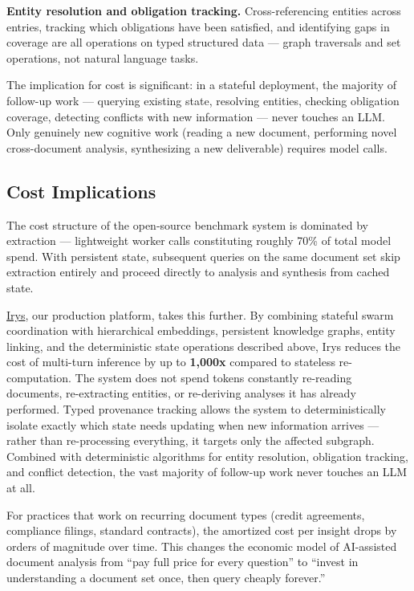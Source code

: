 \documentclass[11pt,a4paper]{article}
\begin{document}
\textbf{Entity resolution and obligation tracking.} Cross-referencing entities across entries, tracking which obligations have been satisfied, and identifying gaps in coverage are all operations on typed structured data — graph traversals and set operations, not natural language tasks.

The implication for cost is significant: in a stateful deployment, the majority of follow-up work — querying existing state, resolving entities, checking obligation coverage, detecting conflicts with new information — never touches an LLM. Only genuinely new cognitive work (reading a new document, performing novel cross-document analysis, synthesizing a new deliverable) requires model calls.

\subsection{Cost Implications}

The cost structure of the open-source benchmark system is dominated by extraction — lightweight worker calls constituting roughly 70\% of total model spend. With persistent state, subsequent queries on the same document set skip extraction entirely and proceed directly to analysis and synthesis from cached state.

\href{https://www.irys.ai}{Irys}, our production platform, takes this further. By combining stateful swarm coordination with hierarchical embeddings, persistent knowledge graphs, entity linking, and the deterministic state operations described above, Irys reduces the cost of multi-turn inference by up to \textbf{1,000x} compared to stateless re-computation. The system does not spend tokens constantly re-reading documents, re-extracting entities, or re-deriving analyses it has already performed. Typed provenance tracking allows the system to deterministically isolate exactly which state needs updating when new information arrives — rather than re-processing everything, it targets only the affected subgraph. Combined with deterministic algorithms for entity resolution, obligation tracking, and conflict detection, the vast majority of follow-up work never touches an LLM at all.

For practices that work on recurring document types (credit agreements, compliance filings, standard contracts), the amortized cost per insight drops by orders of magnitude over time. This changes the economic model of AI-assisted document analysis from ``pay full price for every question'' to ``invest in understanding a document set once, then query cheaply forever.''
\end{document}
